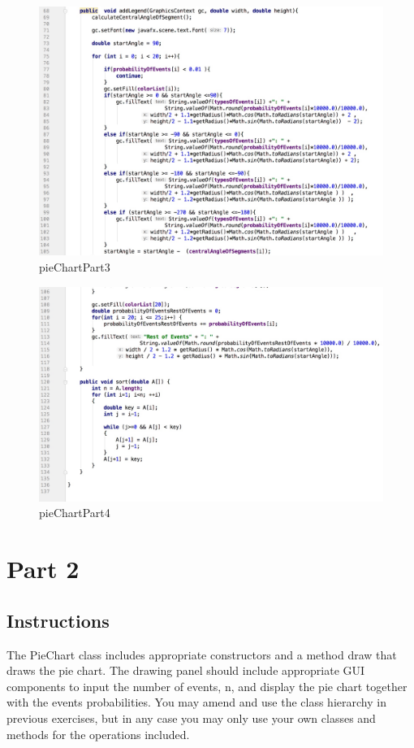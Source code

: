 \documentclass[a4paper,12pt]{article}
\begin{document}
\begin{figure}[H]
   \centering
   \includegraphics[width = 17cm]{pieChartPart3} %
   \caption{pieChartPart3}
   \label{pieChartPart3}
\end{figure}


\begin{figure}[H]
   \centering
   \includegraphics[width = 17cm]{pieChartPart4} %
   \caption{pieChartPart4}
   \label{pieChartPart4}
\end{figure}



\section{Part 2}


\subsection{Instructions}
The PieChart class includes appropriate constructors and a method draw that draws the pie chart. The drawing panel should include appropriate GUI components to input the number of events, n, and display the pie chart together with the events probabilities. You may amend and use the class hierarchy in previous exercises, but in any case you may only use your own classes and methods for the operations included.
\end{document}
